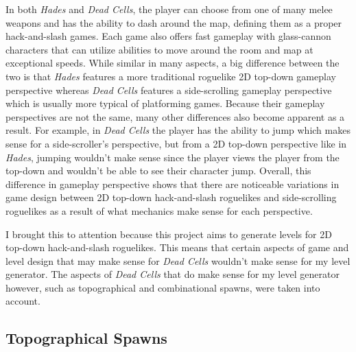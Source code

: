 \documentclass[10pt,twocolumn]{article}
\begin{document}
In both \textit{Hades}\cite{hades} and \textit{Dead Cells}\cite{deadcells}, the player can choose from one of many melee weapons and has the ability to dash around the map, defining them as a proper hack-and-slash games. Each game also offers fast gameplay with glass-cannon characters that can utilize abilities to move around the room and map at exceptional speeds. While similar in many aspects, a big difference between the two is that \textit{Hades} features a more traditional roguelike 2D top-down gameplay perspective whereas \textit{Dead Cells} features a side-scrolling gameplay perspective which is usually more typical of platforming games. Because their gameplay perspectives are not the same, many other differences also become apparent as a result. For example, in \textit{Dead Cells} the player has the ability to jump which makes sense for a side-scroller's perspective, but from a 2D top-down perspective like in \textit{Hades}, jumping wouldn't make sense since the player views the player from the top-down and wouldn't be able to see their character jump. Overall, this difference in gameplay perspective shows that there are noticeable variations in game design between 2D top-down hack-and-slash roguelikes and side-scrolling roguelikes as a result of what mechanics make sense for each perspective.

I brought this to attention because this project aims to generate levels for 2D top-down hack-and-slash roguelikes. This means that certain aspects of game and level design that may make sense for \textit{Dead Cells} wouldn't make sense for my level generator. The aspects of \textit{Dead Cells} that do make sense for my level generator however, such as topographical and combinational spawns, were taken into account. 

\subsection{Topographical Spawns}
\end{document}
